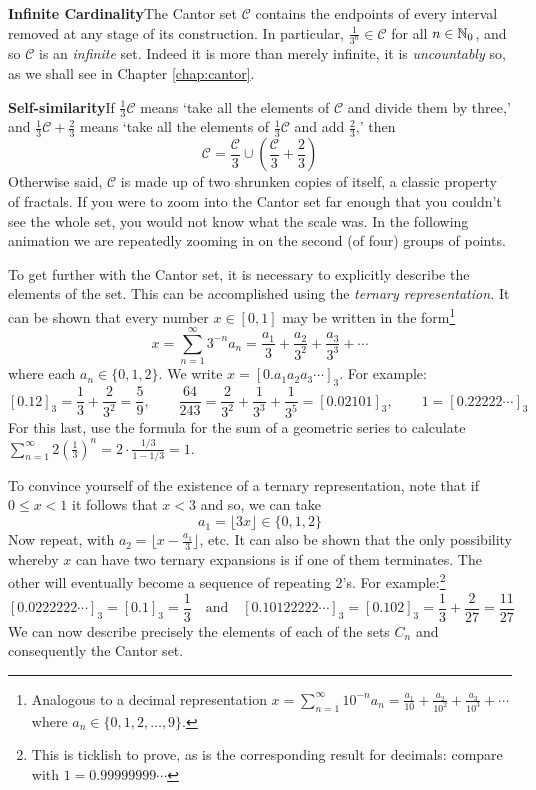 {\bf Infinite Cardinality}\quad The Cantor set $\mathcal{C}$ contains the endpoints of every interval removed at any stage of its construction. In particular, $\frac 1{3^n}\in\mathcal C$ for all $n\in\mathbb{N}_0$, and so $\mathcal C$ is an \emph{infinite} set. Indeed it is more than merely infinite, it is \emph{uncountably} so, as we shall see in Chapter \ref{chap:cantor}.\par

{\bf Self-similarity}\quad If $\frac 13\mathcal C$ means `take all the elements of $\mathcal C$ and divide them by three,' and $\frac 13\mathcal C+\frac 23$ means `take all the elements of $\frac 13\mathcal C$ and add $\frac 23$,' then
\[
	\mathcal C=\frac{\mathcal C}{3}\cup\left(\frac{\mathcal C}{3}+\frac 23\right) \tag{$\ast$}
\]
Otherwise said, $\mathcal C$ is made up of two shrunken copies of itself, a classic property of fractals. If you were to zoom into the Cantor set far enough that you couldn't see the whole set, you would not know what the scale was. In the following animation we are repeatedly zooming in on the second (of four) groups of points.
\begin{center} 
\end{center}



To get further with the Cantor set, it is necessary to explicitly describe the elements of the set. This can be accomplished using the \emph{ternary representation.}\label{page:cantor} It can be shown that every number $x\in[0,1]$ may be written in the form\footnote{Analogous to a decimal representation $x=\sum\limits_{n=1}^\infty 10^{-n}a_n=\frac{a_1}{10}+\frac{a_2}{10^2}+\frac{a_3}{10^3}+\cdots$ where $a_n\in\{0,1,2,\ldots,9\}$.}
\[
	x=\sum\limits_{n=1}^\infty 3^{-n}a_n=\frac{a_1}{3}+\frac{a_2}{3^2}+\frac{a_3}{3^3}+\cdots
\]
 where each $a_n\in\{0,1,2\}$. We write $x=[0.a_1a_2a_3\cdots]_3$. For example:
\[
	[0.12]_3=\frac 13+\frac 2{3^2}=\frac 59,\qquad \frac{64}{243}=\frac 2{3^2}+\frac 1{3^3}+\frac 1{3^5}=[0.02101]_3,\qquad 1=[0.22222\cdots]_3
\]
For this last, use the formula for the sum of a geometric series to calculate $\sum\limits_{n=1}^\infty 2\left(\frac 13\right)^n=2\cdot\frac{1/3}{1-1/3}=1$.\par
To convince yourself of the existence of a ternary representation, note that if $0\le x<1$ it follows that $x<3$ and so, we can take
\[
	a_1=\lfloor 3x\rfloor\in\{0,1,2\}
\]
Now repeat, with $a_2=\lfloor x-\frac{a_1}3\rfloor$, etc. It can also be shown that the only possibility whereby $x$ can have two ternary expansions is if one of them terminates. The other will eventually become a sequence of repeating 2's. For example:\footnote{This is ticklish to prove, as is the corresponding result for decimals: compare with $1=0.99999999\cdots$}
\[
	[0.0222222\cdots]_3=[0.1]_3=\frac 13\quad \text{and}\quad [0.10122222\cdots]_3=[0.102]_3=\frac 13+\frac 2{27}=\frac{11}{27}
\]
We can now describe precisely the elements of each of the sets $C_n$ and consequently the Cantor set.

